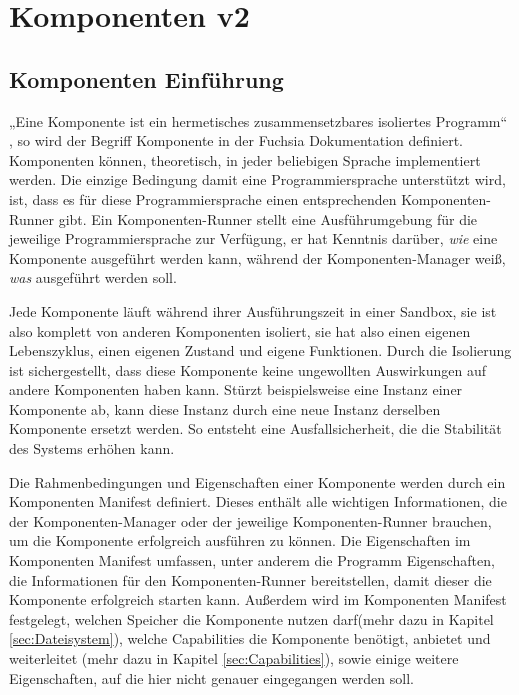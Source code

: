 \documentclass[a4paper]{scrartcl}
\begin{document}
\section{Komponenten v2}
\subsection{Komponenten Einführung}
\label{sec:Components}
„Eine Komponente ist ein hermetisches zusammensetzbares isoliertes Programm“ \cite{Fuchsia.Components.Introduction}, so wird der Begriff Komponente in der Fuchsia Dokumentation definiert. Komponenten können, theoretisch, in jeder beliebigen Sprache implementiert werden. Die einzige Bedingung damit eine Programmiersprache unterstützt wird, ist, dass es für diese Programmiersprache einen entsprechenden Komponenten-Runner gibt. Ein Komponenten-Runner stellt eine Ausführumgebung für die jeweilige Programmiersprache zur Verfügung, er hat Kenntnis darüber, \textit{wie} eine Komponente ausgeführt werden kann, während der Komponenten-Manager weiß, \textit{was} ausgeführt werden soll.

Jede Komponente läuft während ihrer Ausführungszeit in einer Sandbox, sie ist also komplett von anderen Komponenten isoliert, sie hat also einen eigenen Lebenszyklus, einen eigenen Zustand und eigene Funktionen. Durch die Isolierung ist sichergestellt, dass diese Komponente keine ungewollten Auswirkungen auf andere Komponenten haben kann. Stürzt beispielsweise eine Instanz einer Komponente ab, kann diese Instanz durch eine neue Instanz derselben Komponente ersetzt werden. So entsteht eine Ausfallsicherheit, die die Stabilität des Systems erhöhen kann.\cite{Fuchsia.Components.Introduction}

Die Rahmenbedingungen und Eigenschaften einer Komponente werden durch ein Komponenten Manifest definiert. Dieses enthält alle wichtigen Informationen, die der Komponenten-Manager oder der jeweilige Komponenten-Runner brauchen, um die Komponente erfolgreich ausführen zu können.
Die Eigenschaften im Komponenten Manifest umfassen, unter anderem die Programm Eigenschaften, die Informationen für den Komponenten-Runner bereitstellen, damit dieser die Komponente erfolgreich starten kann. Außerdem wird im Komponenten Manifest festgelegt, welchen Speicher die Komponente nutzen darf(mehr dazu in Kapitel \ref{sec:Dateisystem}),  welche Capabilities die Komponente benötigt, anbietet und weiterleitet (mehr dazu in Kapitel \ref{sec:Capabilities}), sowie einige weitere Eigenschaften, auf die hier nicht genauer eingegangen werden soll. \cite{Fuchsia.Components} 
\end{document}

